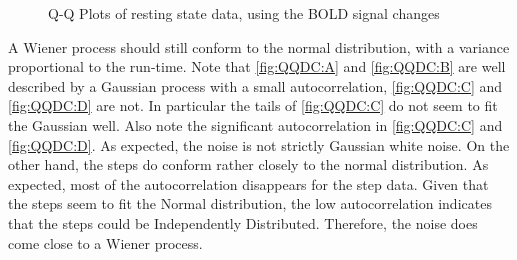 \begin{figure}
\centering
{}
\caption{Q-Q Plots of resting state data, using the BOLD signal changes}
\label{fig:QQDelta}
\end{figure}

A Wiener process should still conform to the normal distribution, with a 
variance proportional to the run-time. Note that \autoref{fig:QQDC:A} and \autoref{fig:QQDC:B}
are well described by a Gaussian process with a small autocorrelation, 
\autoref{fig:QQDC:C} and \autoref{fig:QQDC:D} are not. In particular the tails of \autoref{fig:QQDC:C}
do not seem to fit the Gaussian well. Also note the significant autocorrelation in
\autoref{fig:QQDC:C} and \autoref{fig:QQDC:D}. As expected, the noise is not strictly
Gaussian white noise.  On the other hand, the steps do conform rather
closely to the normal distribution.
As expected, most of the autocorrelation disappears for the step data. Given
that the steps seem to fit the Normal distribution, the low autocorrelation
indicates that the steps could be Independently Distributed. 
Therefore, the noise does come close to a Wiener process. 

